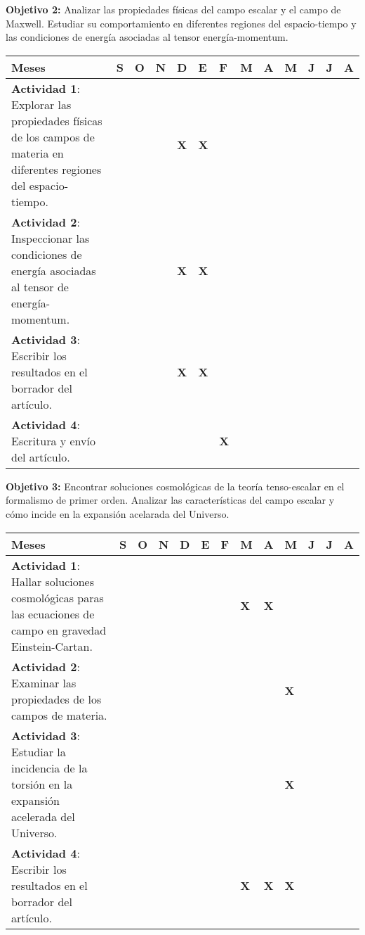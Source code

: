 \textbf{ Objetivo 2:} Analizar las propiedades físicas del campo escalar y el campo de Maxwell. Estudiar su comportamiento en diferentes regiones del espacio-tiempo y las condiciones de energía asociadas al tensor energía-momentum.
\begin{center}
\begin{tabular}{|p{7cm} | p{0.2cm}|p{0.2cm}| p{0.2cm}| p{0.2cm}| p{0.2cm}| p{0.2cm}|p{0.2cm}| p{0.2cm}| p{0.2cm}|p{0.2cm}|p{0.2cm}|p{0.2cm}|} 
 \hline
 \textbf{Meses}&\textbf{S}&\textbf{O}&\textbf{N}&\textbf{D}&\textbf{E}&\textbf{F}&\textbf{M}&\textbf{A}&\textbf{M}&\textbf{J}&\textbf{J}&\textbf{A}\\ \hline
 \textbf{Actividad 1}: Explorar las propiedades físicas de los campos de materia en diferentes regiones del espacio-tiempo.&&&&\textbf{X}&\textbf{X}&&&&&&&\\ \hline
 \textbf{Actividad 2}: Inspeccionar las condiciones de energía asociadas al tensor de energía-momentum.&&&&\textbf{X}&\textbf{X}&&&&&&&\\ \hline
\textbf{ Actividad 3}: Escribir los resultados en el borrador del artículo.&&&&\textbf{X}&\textbf{X}&&&&&&&\\ \hline
\textbf{ Actividad 4}: Escritura y envío del artículo.&&&&&&\textbf{X}&&&&&&\\ \hline
\end{tabular}
\end{center}

 
\textbf{ Objetivo 3:} Encontrar soluciones cosmológicas de la teoría tenso-escalar en el formalismo de primer orden. Analizar las características del campo escalar y cómo incide en la expansión acelarada del Universo.
\begin{center}
\begin{tabular}{|p{7cm} | p{0.2cm}|p{0.2cm}| p{0.2cm}| p{0.2cm}| p{0.2cm}| p{0.2cm}|p{0.2cm}| p{0.2cm}| p{0.2cm}|p{0.2cm}|p{0.2cm}|p{0.2cm}|} 
 \hline
 \textbf{Meses}&\textbf{S}&\textbf{O}&\textbf{N}&\textbf{D}&\textbf{E}&\textbf{F}&\textbf{M}&\textbf{A}&\textbf{M}&\textbf{J}&\textbf{J}&\textbf{A}\\ \hline
 \textbf{Actividad 1}: Hallar soluciones cosmológicas paras las ecuaciones de campo en gravedad Einstein-Cartan.&&&&&&&\textbf{X}&\textbf{X}&&&&\\ \hline
 \textbf{Actividad 2}: Examinar las propiedades de los campos de materia.&&&&&&&&&\textbf{X}&&&\\ \hline
\textbf{ Actividad 3}: Estudiar la incidencia de la torsión en la expansión acelerada del Universo.&&&&&&&&&\textbf{X}&&&\\ \hline
\textbf{ Actividad 4}: Escribir los resultados en el borrador del artículo.&&&&&&&\textbf{X}&\textbf{X}&\textbf{X}&&&\\ \hline
\end{tabular}
\end{center}

